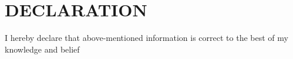 \documentclass[paper=a4,fontsize=12pt]{scrartcl}
\newcommand{\NewPart}[1]{\section*{\uppercase{#1}}}
\begin{document}
\NewPart{Declaration}
I hereby declare that above-mentioned information is correct to the best of my knowledge and belief
\end{document}

